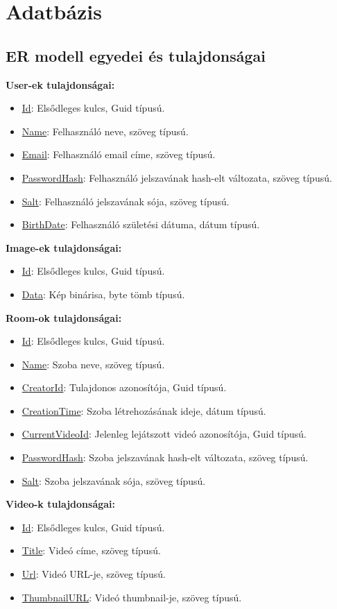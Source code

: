\section*{Adatbázis}
\subsection*{ER modell egyedei és tulajdonságai}
\textbf{User-ek tulajdonságai:}
\begin{itemize}
    \item \underline{Id}: Elsődleges kulcs, Guid típusú.
    \item \underline{Name}: Felhasználó neve, szöveg típusú.
    \item \underline{Email}: Felhasználó email címe, szöveg típusú.
    \item \underline{PasswordHash}: Felhasználó jelszavának hash-elt változata, szöveg típusú.
    \item \underline{Salt}: Felhasználó jelszavának sója, szöveg típusú.
    \item \underline{BirthDate}: Felhasználó születési dátuma, dátum típusú.
\end{itemize}
\textbf{Image-ek tulajdonságai:}
\begin{itemize}
    \item \underline{Id}: Elsődleges kulcs, Guid típusú.
    \item \underline{Data}: Kép binárisa, byte tömb típusú.
\end{itemize}
\textbf{Room-ok tulajdonságai:}
\begin{itemize}
    \item \underline{Id}: Elsődleges kulcs, Guid típusú.
    \item \underline{Name}: Szoba neve, szöveg típusú.
    \item \underline{CreatorId}: Tulajdonos azonosítója, Guid típusú.
    \item \underline{CreationTime}: Szoba létrehozásának ideje, dátum típusú.
    \item \underline{CurrentVideoId}: Jelenleg lejátszott videó azonosítója, Guid típusú.
    \item \underline{PasswordHash}: Szoba jelszavának hash-elt változata, szöveg típusú.
    \item \underline{Salt}: Szoba jelszavának sója, szöveg típusú.
\end{itemize}
\textbf{Video-k tulajdonságai:}
\begin{itemize}
    \item \underline{Id}: Elsődleges kulcs, Guid típusú.
    \item \underline{Title}: Videó címe, szöveg típusú.
    \item \underline{Url}: Videó URL-je, szöveg típusú.
    \item \underline{ThumbnailURL}: Videó thumbnail-je, szöveg típusú.
\end{itemize}

